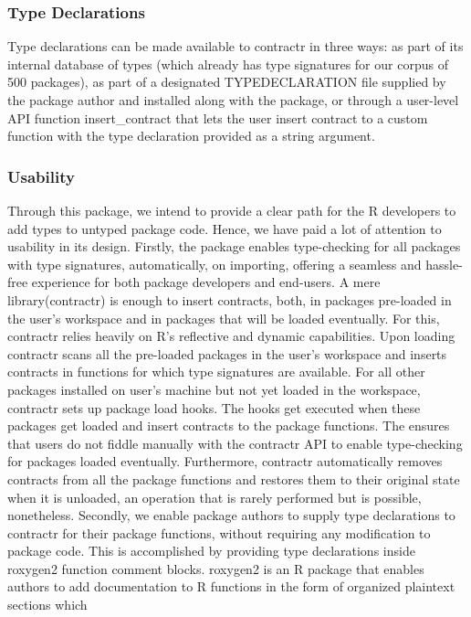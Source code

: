 \documentclass[acmsmall,review,anonymous]{acmart}\settopmatter{printfolios=true,printccs=false,printacmref=false}
\begin{document}
%
%
\subsubsection{Type Declarations}
Type declarations can be made available to contractr in three ways: as part of
its internal database of types (which already has type signatures for our corpus
of 500 packages), as part of a designated TYPEDECLARATION file supplied by the
package author and installed along with the package, or through a user-level API
function insert\_contract that lets the user insert contract to a custom
function with the type declaration provided as a string argument.

%
%
\subsubsection{Usability}
Through this package, we intend to provide a clear path for the R developers to
add types to untyped package code. Hence, we have paid a lot of attention to
usability in its design.
Firstly, the package enables type-checking for all packages with type
signatures, automatically, on importing, offering a seamless and hassle-free
experience for both package developers and end-users. A mere library(contractr)
is enough to insert contracts, both, in packages pre-loaded in the user's
workspace and in packages that will be loaded eventually. For this, contractr
relies heavily on R's reflective and dynamic capabilities. Upon loading
contractr scans all the pre-loaded packages in the user's workspace and inserts
contracts in functions for which type signatures are available. For all other
packages installed on user's machine but not yet loaded in the workspace,
contractr sets up package load hooks. The hooks get executed when these packages
get loaded and insert contracts to the package functions. The ensures that users
do not fiddle manually with the contractr API to enable type-checking for
packages loaded eventually. Furthermore, contractr automatically removes
contracts from all the package functions and restores them to their original
state when it is unloaded, an operation that is rarely performed but is
possible, nonetheless.
Secondly, we enable package authors to supply type declarations to contractr for
their package functions, without requiring any modification to package code.
This is accomplished by providing type declarations inside roxygen2 function
comment blocks. roxygen2 is an R package that enables authors to add
documentation to R functions in the form of organized plaintext sections which
\end{document}
